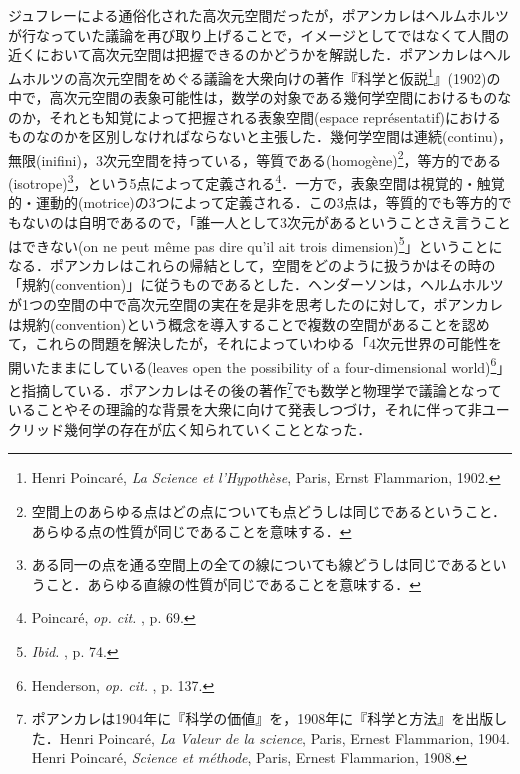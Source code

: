 ジュフレーによる通俗化された高次元空間だったが，ポアンカレはヘルムホルツが行なっていた議論を再び取り上げることで，イメージとしてではなくて人間の近くにおいて高次元空間は把握できるのかどうかを解説した．ポアンカレはヘルムホルツの高次元空間をめぐる議論を大衆向けの著作『科学と仮説\footnote{Henri Poincaré, \emph{La Science et l'Hypothèse}, Paris, Ernst Flammarion, 1902.}』(1902)の中で，高次元空間の表象可能性は，数学の対象である幾何学空間におけるものなのか，それとも知覚によって把握される表象空間(espace représentatif)におけるものなのかを区別しなければならないと主張した．幾何学空間は連続(continu)，無限(inifini)，3次元空間を持っている，等質である(homogène)\footnote{空間上のあらゆる点はどの点についても点どうしは同じであるということ．あらゆる点の性質が同じであることを意味する．}，等方的である(isotrope)\footnote{ある同一の点を通る空間上の全ての線についても線どうしは同じであるということ．あらゆる直線の性質が同じであることを意味する．}，という5点によって定義される\footnote{Poincaré, \emph{op. cit.} , p. 69.}．一方で，表象空間は視覚的・触覚的・運動的(motrice)の3つによって定義される．この3点は，等質的でも等方的でもないのは自明であるので，「誰一人として3次元があるということさえ言うことはできない(on ne peut même pas dire qu'il ait trois dimension)\footnote{\emph{Ibid.} , p. 74.}」ということになる．ポアンカレはこれらの帰結として，空間をどのように扱うかはその時の「規約(convention)」に従うものであるとした．ヘンダーソンは，ヘルムホルツが1つの空間の中で高次元空間の実在を是非を思考したのに対して，ポアンカレは規約(convention)という概念を導入することで複数の空間があることを認めて，これらの問題を解決したが，それによっていわゆる「4次元世界の可能性を開いたままにしている(leaves open the possibility of a four-dimensional world)\footnote{Henderson, \emph{op. cit. }, p. 137.}」と指摘している．ポアンカレはその後の著作\footnote{ポアンカレは1904年に『科学の価値』を，1908年に『科学と方法』を出版した．Henri Poincaré, \emph{La Valeur de la science}, Paris, Ernest Flammarion, 1904. Henri Poincaré, \emph{Science et méthode}, Paris, Ernest Flammarion, 1908. }でも数学と物理学で議論となっていることやその理論的な背景を大衆に向けて発表しつづけ，それに伴って非ユークリッド幾何学の存在が広く知られていくこととなった．

